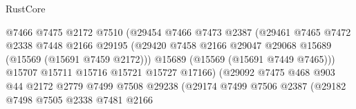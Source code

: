 \begin{lexlean}{RustCore}
\begin{coremodule}
                                          @7466
                                          @7475
                                          @2172
                                          @7510
                                          (@29454
                                            @7466
                                            @7473
                                            @2387
                                            (@29461
                                              @7465
                                              @7472
                                              @2338
                                              @7448
                                              @2166
                                              @29195
                                              (@29420
                                                @7458
                                                @2166
                                                @29047
                                                @29068
                                                @15689
                                                (@15569 (@15691 @7459 @2172)))
                                              @15689
                                              (@15569 (@15691 @7449 @7465)))
                                            @15707
                                            @15711
                                            @15716
                                            @15721
                                            @15727
                                            @17166)
                                          (@29092
                                            @7475
                                            @468
                                            @903
                                            @44
                                            @2172
                                            @2779
                                            @7499
                                            @7508
                                            @29238
                                            (@29174
                                              @7499
                                              @7506
                                              @2387
                                              (@29182
                                                @7498
                                                @7505
                                                @2338
                                                @7481
                                                @2166

\end{coremodule}
\end{lexlean}
